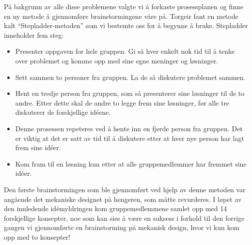 På bakgrunn av alle disse problemene valgte vi å forkaste prosessplanen og finne en ny metode å gjennomføre brainstormingene våre på. Torgeir fant en metode kalt “Stepladder-metoden” \cite{stepladder} som vi bestemte oss for å begynne å bruke. Stepladder inneholder fem steg: 
\begin{itemize}
\item Presenter oppgaven for hele gruppen. Gi så hver enkelt nok tid til å tenke over problemet og komme opp med sine egne meninger og løsninger.

\item Sett sammen to personer fra gruppen. La de så diskutere problemet sammen.

\item Hent en tredje person fra gruppen, som så presenterer sine løsninger til de to andre. Etter dette skal de andre to legge frem sine løsninger, før alle tre diskuterer de forskjellige idéene.

\item Denne prosessen repeteres ved å hente inn en fjerde person fra gruppen. Det er viktig at det er satt av tid til å diskutere etter at hver nye person har lagt frem sine idéer.

\item Kom fram til en løsning kun etter at alle gruppemedlemmer har fremmet sine idéer.
\end{itemize}
Den første brainstormingen som ble gjennomført ved hjelp av denne metoden var angående det mekaniske designet på hengeren, som måtte revurderes. I løpet av den innledende idémyldringen kom gruppemedlemmene samlet opp med 14 forskjellige konsepter, noe som kan sies å være en suksess i forhold til den forrige gangen vi gjennomførte en brainstorming på mekanisk design, hvor vi kun kom opp med to konsepter!

